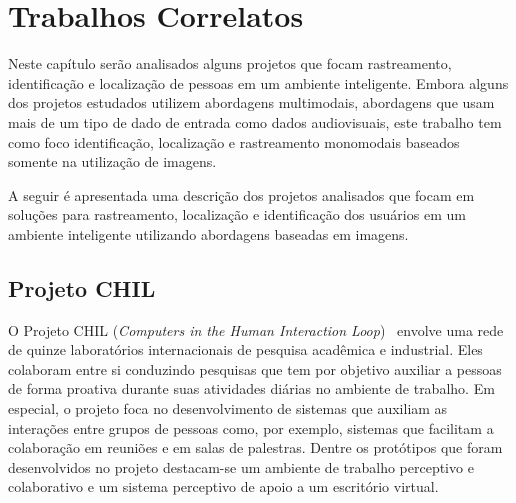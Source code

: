 \chapter{Trabalhos Correlatos}

Neste capítulo serão analisados alguns projetos que focam rastreamento, identificação e localização de pessoas em um ambiente inteligente. Embora alguns dos projetos estudados utilizem abordagens multimodais, abordagens que usam mais de um tipo de dado de entrada como dados audiovisuais, este trabalho tem como foco identificação, localização e rastreamento monomodais baseados somente na utilização de imagens.




A seguir é apresentada uma descrição dos projetos analisados que focam em soluções para rastreamento, localização e identificação dos usuários em um ambiente inteligente utilizando abordagens baseadas em imagens.




\section{Projeto CHIL}

O Projeto CHIL (\textit{Computers in the Human Interaction Loop})~\cite{chil, computerschil} envolve uma rede de quinze laboratórios internacionais de pesquisa acadêmica e industrial. Eles colaboram entre si conduzindo pesquisas que tem por objetivo auxiliar a pessoas de forma proativa durante suas atividades diárias no ambiente de trabalho. Em especial, o projeto foca no desenvolvimento de sistemas que auxiliam as interações entre grupos de pessoas como, por exemplo, sistemas que facilitam a colaboração em reuniões e em salas de palestras. Dentre os protótipos que foram desenvolvidos no projeto destacam-se um ambiente de trabalho perceptivo e colaborativo e um sistema perceptivo de apoio a um escritório virtual.

